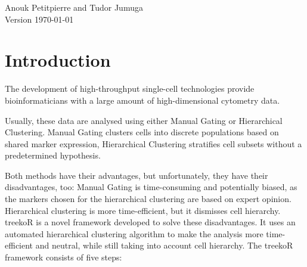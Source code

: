 \documentclass[11pt,a4paper,twoside]{report}\usepackage[]{graphicx}\usepackage[]{color}
\begin{document}
\graphicspath{{./figure/}}            %
\setcounter{tocdepth}{1}              %

\thispagestyle{empty}                 %
\begin{center}
  \vspace*{6cm}{\bfseries\Huge  %
  STA426 treekoR project\\[5mm]
  }
  \vfill

  \LARGE         Anouk Petitpierre and Tudor Jumuga\\[12mm]  %
  
  \normalsize    Version \today            %
\end{center}
\cleardoublepage

\thispagestyle{plain}
\tableofcontents
\cleardoublepage





\chapter{Introduction}

The development of high-throughput single-cell technologies provide bioinformaticians with a large amount of high-dimensional cytometry data. 

Usually, these data are analysed using either Manual Gating or Hierarchical Clustering. Manual Gating clusters cells into discrete populations based on shared marker expression, Hierarchical Clustering stratifies cell subsets without a predetermined hypothesis.

Both methods have their advantages, but unfortunately, they have their disadvantages, too: Manual Gating is time-consuming and potentially biased, as the markers chosen for the hierarchical clustering are based on expert opinion. Hierarchical clustering is more time-efficient, but it dismisses cell hierarchy. treekoR is a novel framework developed to solve these disadvantages. It uses an automated hierarchical clustering algorithm to make the analysis more time-efficient and neutral, while still taking into account cell hierarchy. The treekoR framework consists of five steps:
\end{document}
